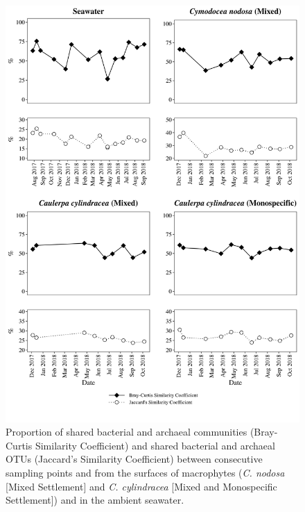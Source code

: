 \documentclass[12pt,]{article}
\begin{document}
\begin{figure}[H]

{\centering \includegraphics[width=0.85\linewidth]{../results/figures/seasonal_shared} 

}

\caption{Proportion of shared bacterial and archaeal communities (Bray-Curtis Similarity Coefficient) and shared bacterial and archaeal OTUs (Jaccard's Similarity Coefficient) between consecutive sampling points and from the surfaces of macrophytes (\textit{C. nodosa} [Mixed Settlement] and \textit{C. cylindracea} [Mixed and Monospecific Settlement]) and in the ambient seawater.\label{shared}}\label{fig:unnamed-chunk-2}
\end{figure}
\end{document}
